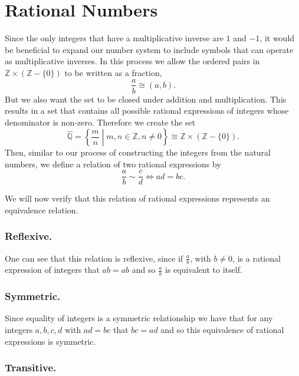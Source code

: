 \documentclass[
]{book}
\theoremstyle{definition}
\theoremstyle{definition}
\theoremstyle{definition}
\theoremstyle{remark}
\begin{document}
\hypertarget{sec:rationals}{%
\section{Rational Numbers}\label{sec:rationals}}

Since the only integers that have a multiplicative inverse are \(1\) and \(-1\), it would be beneficial to expand our number system to include symbols that can operate as multiplicative inverses. In this process we allow the ordered pairs in \(\mathbb{Z}\times (\mathbb{Z}-\{0\})\) to be written as a fraction, \[\frac{a}{b}\cong (a,b).\]
But we also want the set to be closed under addition and multiplication. This results in a set that contains all possible rational expressions of integers whose denominator is non-zero. Therefore we create the set \[\widehat{\mathbb{Q}}= \left\{ \frac{m}{n}\middle \vert m,n \in \mathbb{Z}, n\neq 0\right\} \cong \mathbb{Z}\times (\mathbb{Z}-\{0\}).\] Then, similar to our process of constructing the integers from the natural numbers, we define a relation of two rational expressions by
\[\frac{a}{b} \sim \frac{c}{d} \Leftrightarrow ad=bc.\]

We will now verify that this relation of rational expressions represents an equivalence relation.

\hypertarget{reflexive.}{%
\subsubsection*{Reflexive.}\label{reflexive.}}

One can see that this relation is reflexive, since if \(\frac{a}{b}\), with \(b\neq 0\), is a rational expression of integers that \(ab=ab\) and so \(\frac{a}{b}\) is equivalent to itself.

\hypertarget{symmetric.}{%
\subsubsection*{Symmetric.}\label{symmetric.}}

Since equality of integers is a symmetric relationship we have that for any integers \(a,b,c,d\) with \(ad=bc\) that \(bc=ad\) and so this equivalence of rational expressions is symmetric.

\hypertarget{transitive.}{%
\subsubsection*{Transitive.}\label{transitive.}}
\end{document}
